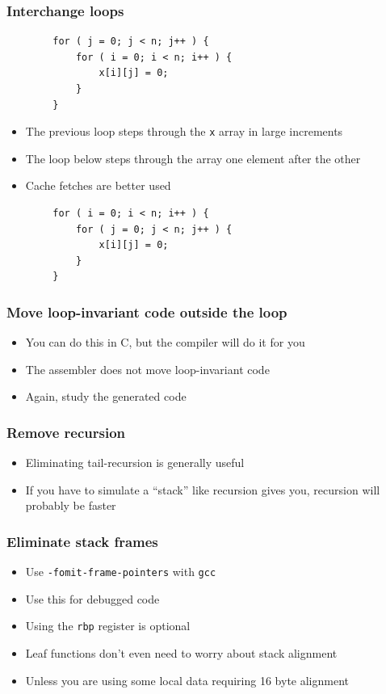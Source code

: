\documentclass{beamer}
\begin{document}
\begin{frame}[fragile]
    \frametitle{Interchange loops}
\begin{verbatim}
        for ( j = 0; j < n; j++ ) {
            for ( i = 0; i < n; i++ ) {
                x[i][j] = 0;
            }
        }
\end{verbatim}
    \begin{itemize}
        \item The previous loop steps through the {\tt x} array in large increments
        \item The loop below steps through the array one element after the other
        \item Cache fetches are better used
    \end{itemize}
\begin{verbatim}
        for ( i = 0; i < n; i++ ) {
            for ( j = 0; j < n; j++ ) {
                x[i][j] = 0;
            }
        }
\end{verbatim}
\end{frame}

\begin{frame}
    \frametitle{Move loop-invariant code outside the loop}
    \begin{itemize}
        \item You can do this in C, but the compiler will do it for you
        \item The assembler does not move loop-invariant code
        \item Again, study the generated code
    \end{itemize}
\end{frame}

\begin{frame}
    \frametitle{Remove recursion}
    \begin{itemize}
        \item Eliminating tail-recursion is generally useful
        \item If you have to simulate a ``stack'' like recursion gives you,
              recursion will probably be faster
    \end{itemize}
\end{frame}


\begin{frame}
    \frametitle{Eliminate stack frames}
    \begin{itemize}
        \item Use {\tt -fomit-frame-pointers} with {\tt gcc}
        \item Use this for debugged code
        \item Using the {\tt rbp} register is optional
        \item Leaf functions don't even need to worry about stack alignment
        \item Unless you are using some local data requiring 16 byte alignment
    \end{itemize}
\end{frame}
\end{document}
